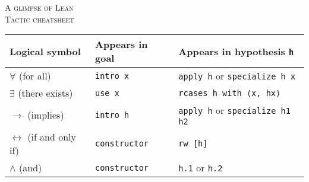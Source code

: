 \documentclass[a4paper]{article}
\newcommand{\lean}[1]{{\tt #1}}
\begin{document}
\pagestyle{empty}
\begin{center}
 {\large\textsc{A glimpse of Lean \\ Tactic cheatsheet}}
\end{center}

\bigskip
\begin{center}
\setlength\tabcolsep{5mm}
\def\arraystretch{1.5}
\begin{tabular}{@{}lll@{}}
  \toprule
  Logical symbol & Appears in goal & Appears in hypothesis \lean{h} \\
  \midrule
  $\forall$ (for all) & \lean{intro x} & \lean{apply h} or \lean{specialize h x}  \\
  $\exists$ (there exists) & \lean{use x} & \lean{rcases h with ⟨x, hx⟩} \\
  $\to$ (implies) & \lean{intro h} & \lean{apply h} or \lean{specialize h1 h2} \\
  $\leftrightarrow$ (if and only if)\qquad & \lean{constructor}  & \lean{rw [h]} \\
  $\wedge$ (and) & \lean{constructor} & \lean{h.1} or \lean{h.2} \\
\bottomrule
\end{tabular}
\end{center}
\end{document}
